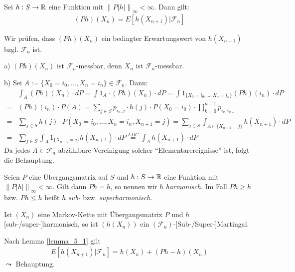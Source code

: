 \documentclass[a4paper,twoside,DIV15,BCOR12mm]{scrbook}
\newcommand{\cF}{\mathcal F}
\begin{document}
\begin{lemma}
  \label{lemma_5_1}
  Sei $h: S \rightarrow \mathbb{R}$ eine Funktion mit $\left\|P \left|h\right| \right\|_\infty < \infty$. Dann gilt:
  \begin{align*}
    (Ph)(X_n) = E[h(X_{n+1})|\cF_n]
  \end{align*}
\end{lemma}
\begin{beweis}
  Wir prüfen, dass $(Ph)(X_n)$ ein bedingter Erwartungswert von $h(X_{n+1})$ bzgl. $\cF_n$ ist.

  a) $(Ph)(X_n)$ ist $\cF_n$-messbar, denn $X_n$ ist $\cF_n$-messbar.

  b) Sei $A := \{X_0 = i_0, \ldots, X_n = i_n\} \in \cF_n$. Dann:
  \begin{align*}
      &\int_A (Ph)(X_n) \cdot dP = \int 1_A \cdot (Ph)(X_n) \cdot dP = \int 1_{\{X_0 = i_0, \ldots, X_n = i_n\}} (Ph)(i_n) \cdot dP\\
    = &(Ph)(i_n) \cdot P(A) = \sum_{j \in S} p_{i_n,j} \cdot h(j) \cdot P(X_0 = i_0) \cdot \prod_{k=0}^{n-1} p_{i_k,i_{k+1}}\\
    = &\sum_{j \in S} h(j) \cdot P(X_0 = i_0, \ldots, X_n = i_n, X_{n+1} = j) = \sum_{j \in S} \int_{A \cap \{X_{n+1} = j\}} h(X_{n+1}) \cdot dP\\
    = &\sum_{j \in S} \int_A 1_{\{X_{n+1} = j\}} h(X_{n+1}) \cdot dP \stackrel{LDC}{=} \int_A h(X_{n+1}) \cdot dP
  \end{align*}
  Da jedes $A \in \cF_n$ abzählbare Vereinigung solcher ``Elementarereignisse'' ist, folgt die Behauptung.
\end{beweis}

\begin{satzunddefinition}
  Seien $P$ eine Übergangsmatrix auf $S$ und $h: S \rightarrow \mathbb{R}$ eine Funktion mit $\left\|P \left|h\right| \right\|_\infty < \infty$. Gilt
  dann $Ph = h$, so nennen wir $h$ \emph{harmonisch}. Im Fall $Ph \geq h$ bzw. $Ph \leq h$ heißt $h$ \emph{sub-} bzw. \emph{superharmonisch}.

  Ist $(X_n)$ eine Markov-Kette mit Übergangsmatrix $P$ und $h$ [sub-/super-]harmonisch, so ist $(h(X_n))$ ein $(\cF_n)$-[Sub-/Super-]Martingal.
\end{satzunddefinition}
\begin{beweis}
  Nach Lemma \ref{lemma_5_1} gilt
  \begin{align*}
    E[h(X_{n+1})|\cF_n] = h(X_n) + (Ph - h)(X_n)
  \end{align*}
  $\leadsto$ Behauptung.
\end{beweis}
\end{document}
